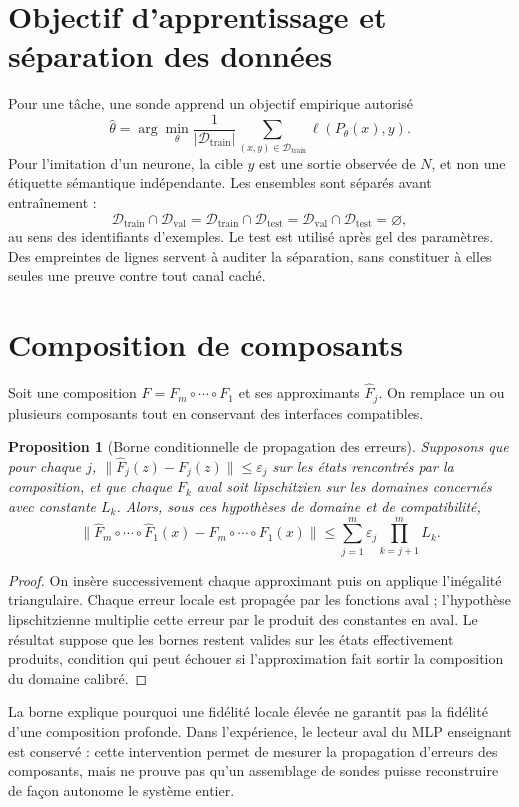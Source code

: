 \documentclass[11pt,a4paper]{article}
\newtheorem{proposition}{Proposition}
\begin{document}
\section{Objectif d'apprentissage et séparation des données}
Pour une tâche, une sonde apprend un objectif empirique autorisé
\[
 \hat\theta=\arg\min_{\theta}\frac{1}{|\mathcal D_{\mathrm{train}}|}
 \sum_{(x,y)\in\mathcal D_{\mathrm{train}}}\ell(P_\theta(x),y).
\]
Pour l'imitation d'un neurone, la cible $y$ est une sortie observée de $N$, et non une étiquette sémantique indépendante. Les ensembles sont séparés avant entraînement :
\[
 \mathcal D_{\mathrm{train}}\cap\mathcal D_{\mathrm{val}}=
 \mathcal D_{\mathrm{train}}\cap\mathcal D_{\mathrm{test}}=
 \mathcal D_{\mathrm{val}}\cap\mathcal D_{\mathrm{test}}=\varnothing,
\]
au sens des identifiants d'exemples. Le test est utilisé après gel des paramètres. Des empreintes de lignes servent à auditer la séparation, sans constituer à elles seules une preuve contre tout canal caché.

\section{Composition de composants}
Soit une composition $F=F_m\circ\cdots\circ F_1$ et ses approximants $\widehat F_j$. On remplace un ou plusieurs composants tout en conservant des interfaces compatibles.

\begin{proposition}[Borne conditionnelle de propagation des erreurs]
Supposons que pour chaque $j$, $\|\widehat F_j(z)-F_j(z)\|\leq\varepsilon_j$ sur les états rencontrés par la composition, et que chaque $F_k$ aval soit lipschitzien sur les domaines concernés avec constante $L_k$. Alors, sous ces hypothèses de domaine et de compatibilité,
\[
 \|\widehat F_m\circ\cdots\circ\widehat F_1(x)-F_m\circ\cdots\circ F_1(x)\|
 \leq \sum_{j=1}^{m}\varepsilon_j\prod_{k=j+1}^{m}L_k.
\]
\end{proposition}
\begin{proof}
On insère successivement chaque approximant puis on applique l'inégalité triangulaire. Chaque erreur locale est propagée par les fonctions aval ; l'hypothèse lipschitzienne multiplie cette erreur par le produit des constantes en aval. Le résultat suppose que les bornes restent valides sur les états effectivement produits, condition qui peut échouer si l'approximation fait sortir la composition du domaine calibré.
\end{proof}

La borne explique pourquoi une fidélité locale élevée ne garantit pas la fidélité d'une composition profonde. Dans l'expérience, le lecteur aval du MLP enseignant est conservé : cette intervention permet de mesurer la propagation d'erreurs des composants, mais ne prouve pas qu'un assemblage de sondes puisse reconstruire de façon autonome le système entier.
\end{document}
